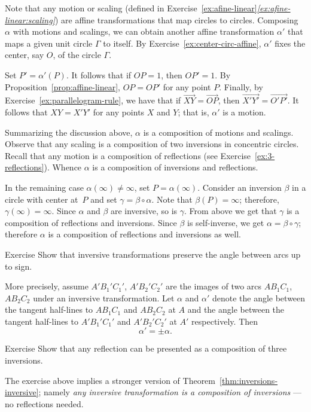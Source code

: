 Note that any motion or scaling (defined in Exercise~\ref{ex:afine-linear}\textit{\ref{ex:afine-linear:scaling}}) are affine transformations that map circles to circles.
Composing $\alpha$ with motions and scalings, we can obtain another affine transformation $\alpha'$ that maps a given unit circle $\Gamma$ to itself.
By Exercise~\ref{ex:center-circ-affine},
$\alpha'$ fixes the center, say $O$, of the circle $\Gamma$.

Set $P'=\alpha'(P)$.
It follows that if $OP=1$, then $OP'=1$.
By Proposition~\ref{prop:affine-linear}, $OP=OP'$ for any point $P$.
Finally, by Exercise~\ref{ex:parallelogram-rule}, we have that if 
$\overrightarrow{XY}=\overrightarrow{OP}$, then $\overrightarrow{X'Y'}=\overrightarrow{O'P'}$.
It follows that $XY=X'Y'$ for any points $X$ and $Y$;
that is, $\alpha'$ is a motion.

Summarizing the discussion above, $\alpha$ is a composition of motions and scalings.
Observe that any scaling is a composition of two inversions in concentric circles.
Recall that any motion is a composition of reflections (see Exercise~\ref{ex:3-reflections}).
Whence $\alpha$ is a composition of inversions and reflections.


In the remaining case $\alpha(\infty)\ne \infty$, set $P=\alpha(\infty)$.
Consider an inversion $\beta$ in a circle with center at~$P$ and set $\gamma=\beta\circ\alpha$.
Note that $\beta(P)=\infty$; 
therefore, $\gamma(\infty)=\infty$.
Since $\alpha$ and $\beta$ are inversive, so is $\gamma$.
From above we get that $\gamma$ is a composition of reflections and inversions.
Since $\beta$ is self-inverse, we get
$\alpha=\beta\circ\gamma$;
therefore $\alpha$ is a composition of reflections and inversions as well.
\qeds

\begin{thm}{Exercise}\label{ex:inversive-angle}
Show that inversive transformations preserve the angle between arcs up to sign.

More precisely, assume $A'B_1'C_1'$, $A'B_2'C_2'$ are the images of two arcs $AB_1C_1$, $AB_2C_2$ under an inversive transformation.
Let $\alpha$ and $\alpha'$ denote the angle between the tangent half-lines to $AB_1C_1$ and $AB_2C_2$ at $A$
and the angle between the tangent half-lines to $A'B_1'C_1'$ and $A'B_2'C_2'$ at $A'$ respectively.
Then 
\[\alpha'=\pm \alpha.\]
\end{thm}


\begin{thm}{Exercise}\label{ex:reflection/inversive}
Show that any reflection can be presented as a composition of three inversions. 
\end{thm}

The exercise above implies a stronger version of Theorem~\ref{thm:inversions-inversive};
namely \emph{any inversive transformation is a composition of inversions} ---
no reflections needed.

